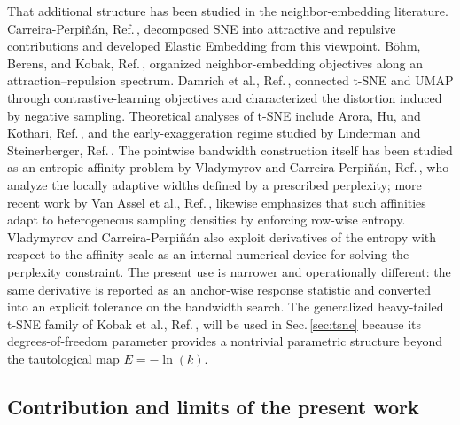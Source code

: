 \documentclass[11pt,a4paper]{article}
\theoremstyle{definition}
\theoremstyle{plain}
\begin{document}
That additional structure has been studied in the neighbor-embedding literature. Carreira-Perpi\~n\'an, Ref.\,\cite{carreira2010elastic}, decomposed SNE into attractive and repulsive contributions and developed Elastic Embedding from this viewpoint. B\"ohm, Berens, and Kobak, Ref.\,\cite{bohm2022spectrum}, organized neighbor-embedding objectives along an attraction--repulsion spectrum. Damrich et al., Ref.\,\cite{damrich2023contrastive}, connected t-SNE and UMAP through contrastive-learning objectives and characterized the distortion induced by negative sampling. Theoretical analyses of t-SNE include Arora, Hu, and Kothari, Ref.\,\cite{arora2018analysis}, and the early-exaggeration regime studied by Linderman and Steinerberger, Ref.\,\cite{linderman2019provably}. The pointwise bandwidth construction itself has been studied as an entropic-affinity problem by Vladymyrov and Carreira-Perpi\~n\'an, Ref.\,\cite{vladymyrov2013entropic}, who analyze the locally adaptive widths defined by a prescribed perplexity; more recent work by Van Assel et al., Ref.\,\cite{vanassel2023snekhorn}, likewise emphasizes that such affinities adapt to heterogeneous sampling densities by enforcing row-wise entropy. Vladymyrov and Carreira-Perpi\~n\'an also exploit derivatives of the entropy with respect to the affinity scale as an internal numerical device for solving the perplexity constraint. The present use is narrower and operationally different: the same derivative is reported as an anchor-wise response statistic and converted into an explicit tolerance on the bandwidth search. The generalized heavy-tailed t-SNE family of Kobak et al., Ref.\,\cite{kobak2020heavy}, will be used in Sec.\,\ref{sec:tsne} because its degrees-of-freedom parameter provides a nontrivial parametric structure beyond the tautological map $E=-\ln\left(k\right)$.

\subsection{Contribution and limits of the present work}
\label{subsec:contribution_scope}
\end{document}
